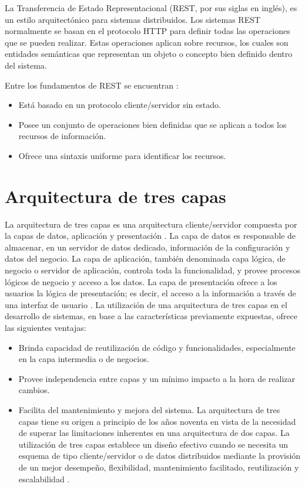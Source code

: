 La Transferencia de Estado Representacional (REST, por sus siglas en inglés), es un estilo arquitectónico para sistemas distribuidos. Los sistemas REST normalmente se basan en el protocolo HTTP para definir todas las operaciones que se pueden realizar. Estas operaciones aplican sobre recursos, los cuales son entidades semánticas que representan un objeto o concepto bien definido dentro del sistema\cite{MTREST}.

Entre los fundamentos de REST se encuentran \cite{MTREST}:
\begin{itemize}[noitemsep,nolistsep]
\item Está basado en un protocolo cliente/servidor sin estado.
\item Posee un conjunto de operaciones bien definidas que se aplican a todos los recursos de información.
\item Ofrece una sintaxis uniforme para identificar los recursos.
\end{itemize}

\section{Arquitectura de tres capas} \label{sect:Arquitectura de tres capas}
La arquitectura de tres capas es una arquitectura cliente/servidor compuesta por la capas de datos, aplicación y presentación \cite{MTATC}.
La capa de datos es responsable de almacenar, en un servidor de datos dedicado, información de la configuración y datos del negocio. La capa de aplicación, también denominada capa lógica, de negocio o servidor de aplicación, controla toda la funcionalidad, y provee procesos lógicos de negocio y acceso a los datos. La capa de presentación ofrece a los usuarios la lógica de presentación; es decir, el acceso a la información a través de una interfaz de usuario \cite{MTATC2}.
La utilización de una arquitectura de tres capas en el desarrollo de sistemas, en base a las características previamente expuestas, ofrece las siguientes ventajas:
\begin{itemize}[noitemsep,nolistsep]
\item Brinda capacidad de reutilización de código y funcionalidades, especialmente en la capa intermedia o de negocios.
\item Provee independencia entre capas y un mínimo impacto a la hora de realizar cambios. 
\item Facilita del mantenimiento y mejora del sistema.
La arquitectura de tres capas tiene su origen a principio de los años noventa en vista de la necesidad de superar las limitaciones inherentes en una arquitectura de dos capas. La utilización de tres capas establece un diseño efectivo cuando se necesita un esquema de tipo cliente/servidor o de datos distribuidos mediante la provisión de un mejor desempeño, flexibilidad, mantenimiento facilitado, reutilización y escalabilidad \cite{MTATC3}.
\end{itemize}

